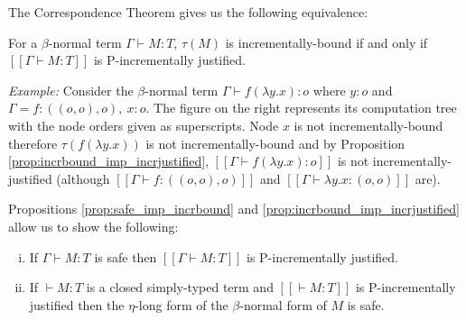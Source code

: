 \documentclass{llncs}
\newcommand{\sem}[1]{{[\![ #1 ]\!]}}
\newcommand{\tree}[2][levelsep=3.5ex]{\pstree[levelsep=3.5ex,#1]{\TR{#2}}}
\begin{document}
The Correspondence Theorem
gives us the following equivalence:
\begin{proposition} %
\label{prop:incrbound_imp_incrjustified}
For a $\beta$-normal term $\Gamma \vdash M : T$,
$\tau(M)$ is incrementally-bound if and only if $\sem{\Gamma \vdash M : T}$
is P-incrementally justified.
\end{proposition}



\parpic[r]{
${\tree{\lambda^3}{\tree{f^2}{ \tree{\lambda y^1}{ \TR{x^0} }}}}$
}
\noindent \emph{Example:} %
Consider the $\beta$-normal term $\Gamma\vdash f (\lambda y .x) : o$ where $y:o$ and $\Gamma =f:((o,o),o),~x:o$. The figure on the right represents its computation tree
with the node orders given as superscripts.  Node $x$ is not
incrementally-bound therefore $\tau(f (\lambda y .x))$ is not
incrementally-bound and by Proposition
\ref{prop:incrbound_imp_incrjustified}, $\sem{\Gamma \vdash f (\lambda y .x) : o}$ is
not incrementally-justified (although $\sem{\Gamma \vdash f : ((o,o),o)}$ and $\sem{\Gamma \vdash \lambda
  y. x : (o,o)}$ are).
\smallskip

Propositions \ref{prop:safe_imp_incrbound} and
\ref{prop:incrbound_imp_incrjustified} allow us to show the following:
\begin{theorem}
\label{thm:safeincrejust}
\begin{enumerate}[(i)]
\item If $\Gamma \vdash M : T$ is safe then $\sem{\Gamma \vdash M : T}$ is P-incrementally justified.
\item If $\vdash M : T$ is a closed simply-typed term and $\sem{\vdash M : T}$ is P-incrementally justified then the $\eta$-long form of the $\beta$-normal form of $M$ is safe.
\end{enumerate}
\end{theorem}
\end{document}

